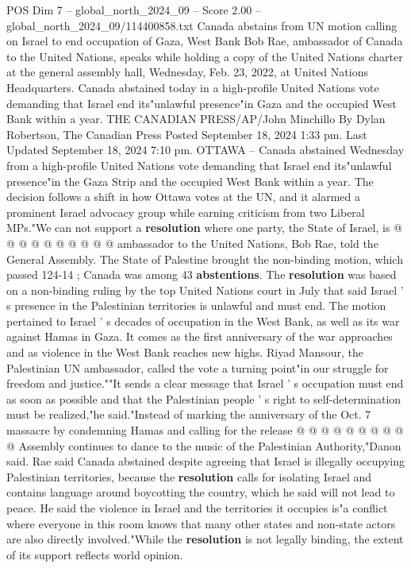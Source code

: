 \begin{textsample}{POS Dim 7 – global\_north\_2024\_09 – Score 2.00 – global\_north\_2024\_09/114400858.txt}  \label{ex:f7_pos_435}
Canada abstains from UN motion calling on Israel to end occupation of Gaza, West Bank Bob Rae, ambassador of Canada to the United Nations, speaks while holding a copy of the United Nations charter at the general assembly hall, Wednesday, Feb. 23, 2022, at United Nations Headquarters.
Canada abstained today in a high-profile United Nations vote demanding that Israel end its"unlawful presence"in Gaza and the occupied West Bank within a year.
THE CANADIAN PRESS/AP/John Minchillo By Dylan Robertson, The Canadian Press Posted September 18, 2024 1:33 pm.
Last Updated September 18, 2024 7:10 pm.
OTTAWA -- Canada abstained Wednesday from a high-profile United Nations vote demanding that Israel end its"unlawful presence"in the Gaza Strip and the occupied West Bank within a year.
The decision follows a shift in how Ottawa votes at the UN, and it alarmed a prominent Israel advocacy group while earning criticism from two Liberal MPs."We can not support a \textbf{resolution} where one party, the State of Israel, is @ @ @ @ @ @ @ @ @ @ ambassador to the United Nations, Bob Rae, told the General Assembly.
The State of Palestine brought the non-binding motion, which passed 124-14 ; Canada was among 43 \textbf{abstentions}.
The \textbf{resolution} was based on a non-binding ruling by the top United Nations court in July that said Israel ' s presence in the Palestinian territories is unlawful and must end.
The motion pertained to Israel ' s decades of occupation in the West Bank, as well as its war against Hamas in Gaza.
It comes as the first anniversary of the war approaches and as violence in the West Bank reaches new highs.
Riyad Mansour, the Palestinian UN ambassador, called the vote a turning point"in our struggle for freedom and justice.""It sends a clear message that Israel ' s occupation must end as soon as possible and that the Palestinian people ' s right to self-determination must be realized,"he said."Instead of marking the anniversary of the Oct. 7 massacre by condemning Hamas and calling for the release @ @ @ @ @ @ @ @ @ @ Assembly continues to dance to the music of the Palestinian Authority,"Danon said.
Rae said Canada abstained despite agreeing that Israel is illegally occupying Palestinian territories, because the \textbf{resolution} calls for isolating Israel and contains language around boycotting the country, which he said will not lead to peace.
He said the violence in Israel and the territories it occupies is"a conflict where everyone in this room knows that many other states and non-state actors are also directly involved."While the \textbf{resolution} is not legally binding, the extent of its support reflects world opinion.

\end{textsample}
